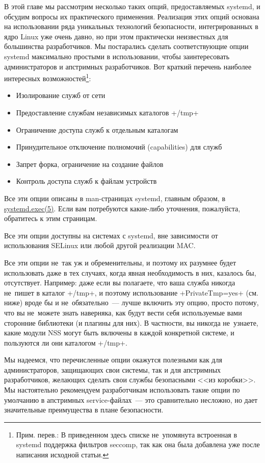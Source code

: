\documentclass[10pt,oneside,a4paper]{article}
\begin{document}
В этой главе мы рассмотрим несколько таких опций, предоставляемых systemd, и
обсудим вопросы их практического применения. Реализация этих опций основана на
использовании ряда уникальных технологий безопасности, интегрированных в ядро
Linux уже очень давно, но при этом практически неизвестных для большинства
разработчиков. Мы постарались сделать соответствующие опции systemd максимально
простыми в использовании, чтобы заинтересовать администраторов и апстримных
разработчиков. Вот краткий перечень наиболее интересных
возможностей\footnote{Прим. перев.: В приведенном здесь списке не~упомянута
встроенная в systemd поддержка фильтров seccomp, так как она была добавлена уже
после написания исходной статьи.}:
\begin{itemize}
	\item Изолирование служб от сети
	\item Предоставление службам независимых каталогов +/tmp+
	\item Ограничение доступа служб к отдельным каталогам
	\item Принудительное отключение полномочий (capabilities) для служб
	\item Запрет форка, ограничение на создание файлов
	\item Контроль доступа служб к файлам устройств
\end{itemize}

Все эти опции описаны в man-страницах systemd, главным образом, в
\href{http://0pointer.de/public/systemd-man/systemd.exec.html}{systemd.exec(5)}.
Если вам потребуются какие-либо уточнения, пожалуйста, обратитесь к этим
страницам.

Все эти опции доступны на системах с systemd, вне зависимости от использования
SELinux или любой другой реализации MAC.

Все эти опции не~так уж и обременительны, и поэтому их разумнее будет
использовать даже в тех случаях, когда явная необходимость в них, казалось бы,
отсутствует. Например: даже если вы полагаете, что ваша служба никогда не~пишет
в каталог +/tmp+, и поэтому использование +PrivateTmp=yes+ (см. ниже) вроде бы и
не~обязательно~--- лучше включить эту опцию, просто потому, что вы не~можете
знать наверняка, как будут вести себя используемые вами сторонние библиотеки (и
плагины для них). В частности, вы никогда не~узнаете, какие модули NSS могут
быть включены в каждой конкретной системе, и пользуются ли они каталогом +/tmp+.

Мы надеемся, что перечисленные опции окажутся полезными как для администраторов,
защищающих свои системы, так и для апстримных разработчиков, желающих сделать
свои службы безопасными <<из коробки>>. Мы настоятельно рекомендуем
разработчикам использовать такие опции по умолчанию в апстримных
service-файлах~--- это сравнительно несложно, но дает значительные преимущества
в плане безопасности.
\end{document}
